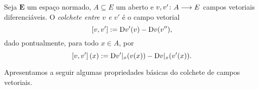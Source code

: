 \begin{definition}
Seja $\bm E$ um espaço normado, $A \subseteq E$ um aberto e $v,v'\colon \allowbreak A \longrightarrow E$ campos vetoriais diferenciáveis. O \emph{colchete entre $v$ e $v'$} é o campo vetorial
	\begin{equation*}
	\left[{v},{v'}\right] := \mathrm{D} v'(v) - \mathrm{D} v(v''),
	\end{equation*}
dado pontualmente, para todo $x \in A$, por
	\begin{equation*}
	\left[{v},{v'}\right](x) := \mathrm{D} v'|_x(v(x)) - \mathrm{D} v|_x(v'(x)).
	\end{equation*}
\end{definition}


Apresentamos a seguir algumas propriedades básicas do colchete de campos vetoriais.

